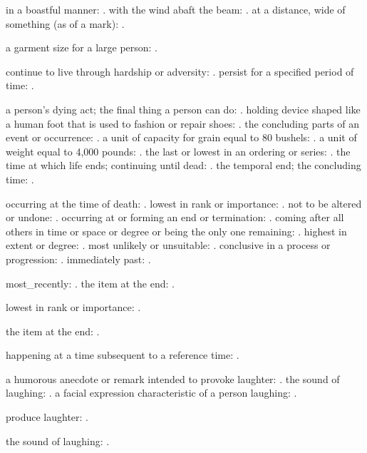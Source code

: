   in a boastful manner: . with the wind abaft the beam: . at a distance, wide of something (as of a mark): .

  a garment size for a large person: .

  continue to live through hardship or adversity: . persist for a specified period of time: .

  a person's dying act; the final thing a person can do: . holding device shaped like a human foot that is used to fashion or repair shoes: . the concluding parts of an event or occurrence: . a unit of capacity for grain equal to 80 bushels: . a unit of weight equal to 4,000 pounds: . the last or lowest in an ordering or series: . the time at which life ends; continuing until dead: . the temporal end; the concluding time: .

  occurring at the time of death: . lowest in rank or importance: . not to be altered or undone: . occurring at or forming an end or termination: . coming after all others in time or space or degree or being the only one remaining: . highest in extent or degree: . most unlikely or unsuitable: . conclusive in a process or progression: . immediately past: .

  most\_recently: . the item at the end: .

  lowest in rank or importance: .

  the item at the end: .

  happening at a time subsequent to a reference time: .

  a humorous anecdote or remark intended to provoke laughter: . the sound of laughing: . a facial expression characteristic of a person laughing: .

  produce laughter: .

  the sound of laughing: .

